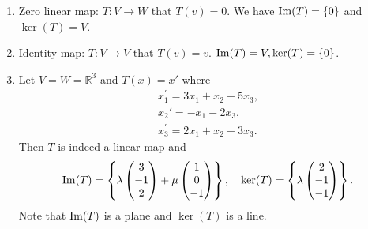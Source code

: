 \documentclass[a4paper]{article}
\begin{document}
\begin{example}
  \begin{enumerate}[(1)]
    \item Zero linear map: $ T:V\to W $ that $ T(v)=0 $. We have $
      \operatorname{Im}(T)=\left\{ 0\right\} $ and $ \ker(T)=V $.
    \item Identity map: $ T:V\to V $ that $ T(v)=v $. $ \operatorname{Im}(T)=V,
      \ker(T)=\left\{ 0\right\} $.
    \item Let $ V=W=\mathbb{R}^3 $ and $ T(x)=x' $ where
      \[
        \begin{array}{l}
          x_{1}^{\prime}=3 x_{1}+x_{2}+5 x_{3}, \\
          x_{2}'=-x_{1}-2 x_{3}, \\
          x_{3}^{\prime}=2 x_{1}+x_{2}+3 x_{3}.
        \end{array}
      \]
      Then $T$ is indeed a linear map and
      \[
        \operatorname{Im}(T)=\left\{ \lambda
          \begin{pmatrix}
            3\\-1\\2
          \end{pmatrix}+\mu
          \begin{pmatrix}
            1\\0\\-1
        \end{pmatrix} \right\},\quad \ker(T)=\left\{ \lambda
          \begin{pmatrix}
            2\\-1\\-1
        \end{pmatrix}\right\}
      .\]
      Note that $\operatorname{Im}(T)$ is a plane and $\ker(T)$ is a line.
  \end{enumerate}
\end{example}
\end{document}
